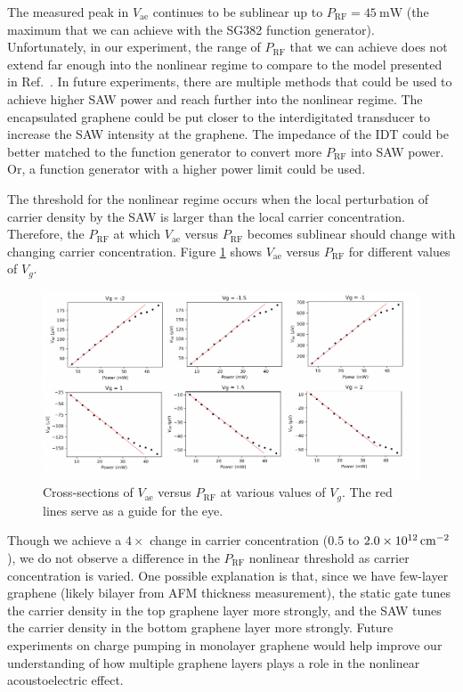\documentclass[double,12pt,1in,seploa]{beavtex}
\begin{document}
The measured peak in $V_{\mathrm{ae}}$ continues to be sublinear up to $P_{\mathrm{RF}} = \SI{45}{\milli\watt}$ (the maximum that we can achieve with the SG382 function generator). Unfortunately, in our experiment, the range of $P_{\mathrm{RF}}$ that we can achieve does not extend far enough into the nonlinear regime to compare to the model presented in Ref.\ \cite{rotter_nonlinear_1999}. In future experiments, there are multiple methods that could be used to achieve higher SAW power and reach further into the nonlinear regime. The encapsulated graphene could be put closer to the interdigitated transducer to increase the SAW intensity at the graphene. The impedance of the IDT could be better matched to the function generator to convert more $P_{\mathrm{RF}}$ into SAW power. Or, a function generator with a higher power limit could be used.

The threshold for the nonlinear regime occurs when the local perturbation of carrier density by the SAW is larger than the local carrier concentration. Therefore, the $P_{\mathrm{RF}}$ at which $V_{\mathrm{ae}}$ versus $P_{\mathrm{RF}}$ becomes sublinear should change with changing carrier concentration. Figure \ref{vae vs prf at different vg} shows $V_{\mathrm{ae}}$ versus $P_{\mathrm{RF}}$ for different values of $V_g$. 
\begin{figure}
    \includegraphics[width = 1\textwidth]{vae prf nonlinear at different vg.pdf}
    \caption{Cross-sections of $V_{\mathrm{ae}}$ versus $P_{\mathrm{RF}}$ at various values of $V_g$. The red lines serve as a guide for the eye.}
    \label{vae vs prf at different vg}
\end{figure}
Though we achieve a $4\times$ change in carrier concentration ($0.5$ to $\SI{2.0E12}{\centi\meter^{-2}}$), we do not observe a difference in the $P_{\mathrm{RF}}$ nonlinear threshold as carrier concentration is varied. One possible explanation is that, since we have few-layer graphene (likely bilayer from AFM thickness measurement), the static gate tunes the carrier density in the top graphene layer more strongly, and the SAW tunes the carrier density in the bottom graphene layer more strongly. Future experiments on charge pumping in monolayer graphene would help improve our understanding of how multiple graphene layers plays a role in the nonlinear acoustoelectric effect.
\end{document}
